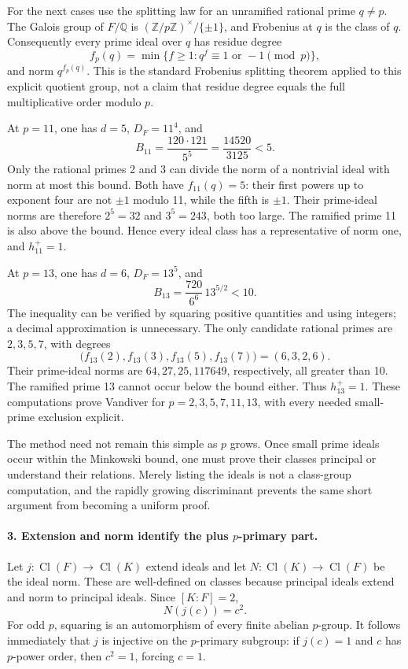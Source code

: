 \documentclass[11pt]{article}
\begin{document}
For the next cases use the splitting law for an unramified rational prime $q\ne p$. The Galois group of $F/\mathbb Q$ is $(\mathbb Z/p\mathbb Z)^\times/\{\pm1\}$, and Frobenius at $q$ is the class of $q$. Consequently every prime ideal over $q$ has residue degree
\[
 f_p(q)=\min\{f\ge1:q^f\equiv1\text{ or }-1\pmod p\},
\]
and norm $q^{f_p(q)}$. This is the standard Frobenius splitting theorem applied to this explicit quotient group, not a claim that residue degree equals the full multiplicative order modulo $p$.

At $p=11$, one has $d=5$, $D_F=11^4$, and
\[
 B_{11}=\frac{120\cdot121}{5^5}=\frac{14520}{3125}<5.
\]
Only the rational primes 2 and 3 can divide the norm of a nontrivial ideal with norm at most this bound. Both have $f_{11}(q)=5$: their first powers up to exponent four are not $\pm1$ modulo 11, while the fifth is $\pm1$. Their prime-ideal norms are therefore $2^5=32$ and $3^5=243$, both too large. The ramified prime 11 is also above the bound. Hence every ideal class has a representative of norm one, and $h_{11}^+=1$.

At $p=13$, one has $d=6$, $D_F=13^5$, and
\[
 B_{13}=\frac{720}{6^6}\,13^{5/2}<10.
\]
The inequality can be verified by squaring positive quantities and using integers; a decimal approximation is unnecessary. The only candidate rational primes are $2,3,5,7$, with degrees
\[
 \bigl(f_{13}(2),f_{13}(3),f_{13}(5),f_{13}(7)\bigr)
   =(6,3,2,6).
\]
Their prime-ideal norms are $64,27,25,117649$, respectively, all greater than 10. The ramified prime 13 cannot occur below the bound either. Thus $h_{13}^+=1$. These computations prove Vandiver for $p=2,3,5,7,11,13$, with every needed small-prime exclusion explicit.

The method need not remain this simple as $p$ grows. Once small prime ideals occur within the Minkowski bound, one must prove their classes principal or understand their relations. Merely listing the ideals is not a class-group computation, and the rapidly growing discriminant prevents the same short argument from becoming a uniform proof.

\paragraph{3. Extension and norm identify the plus $p$-primary part.}
Let $j:\operatorname{Cl}(F)\to\operatorname{Cl}(K)$ extend ideals and let $N:\operatorname{Cl}(K)\to\operatorname{Cl}(F)$ be the ideal norm. These are well-defined on classes because principal ideals extend and norm to principal ideals. Since $[K:F]=2$,
\[
 N(j(c))=c^2.
\]
For odd $p$, squaring is an automorphism of every finite abelian $p$-group. It follows immediately that $j$ is injective on the $p$-primary subgroup: if $j(c)=1$ and $c$ has $p$-power order, then $c^2=1$, forcing $c=1$.
\end{document}
